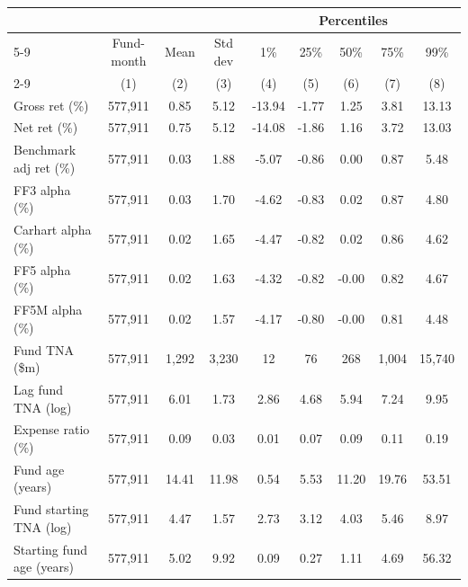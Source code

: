\documentclass[
]{article}
\author{}
\date{\vspace{-2.5em}}
\begin{document}
\begin{tabular}{lcccccccc}
  \toprule & & & & \multicolumn{5}{c}{Percentiles} \\
 \cmidrule(l){5-9} 
  & Fund-month & Mean & Std dev & 1\% & 25\% & 50\% & 75\% & 99\% \\ 
   \cmidrule(l){2-9} \vspace{5pt} & (1) & (2) & (3) & (4) & (5) & (6) & (7) & (8) \\ 
  Gross ret (\%) & 577,911 & 0.85 & 5.12 & -13.94 & -1.77 & 1.25 & 3.81 & 13.13 \\ 
  Net ret (\%) & 577,911 & 0.75 & 5.12 & -14.08 & -1.86 & 1.16 & 3.72 & 13.03 \\ 
  Benchmark adj ret (\%) & 577,911 & 0.03 & 1.88 & -5.07 & -0.86 & 0.00 & 0.87 & 5.48 \\ 
  FF3 alpha (\%) & 577,911 & 0.03 & 1.70 & -4.62 & -0.83 & 0.02 & 0.87 & 4.80 \\ 
  Carhart alpha (\%) & 577,911 & 0.02 & 1.65 & -4.47 & -0.82 & 0.02 & 0.86 & 4.62 \\ 
  FF5 alpha (\%) & 577,911 & 0.02 & 1.63 & -4.32 & -0.82 & -0.00 & 0.82 & 4.67 \\ 
  FF5M alpha (\%) & 577,911 & 0.02 & 1.57 & -4.17 & -0.80 & -0.00 & 0.81 & 4.48 \\ 
  Fund TNA (\$m) & 577,911 & 1,292 & 3,230 & 12 & 76 & 268 & 1,004 & 15,740 \\ 
  Lag fund TNA (log) & 577,911 & 6.01 & 1.73 & 2.86 & 4.68 & 5.94 & 7.24 & 9.95 \\ 
  Expense ratio (\%) & 577,911 & 0.09 & 0.03 & 0.01 & 0.07 & 0.09 & 0.11 & 0.19 \\ 
  Fund age (years) & 577,911 & 14.41 & 11.98 & 0.54 & 5.53 & 11.20 & 19.76 & 53.51 \\ 
  Fund starting TNA (log) & 577,911 & 4.47 & 1.57 & 2.73 & 3.12 & 4.03 & 5.46 & 8.97 \\ 
  Starting fund age (years) & 577,911 & 5.02 & 9.92 & 0.09 & 0.27 & 1.11 & 4.69 & 56.32 \\ 
   \bottomrule 
\end{tabular}
\end{document}
